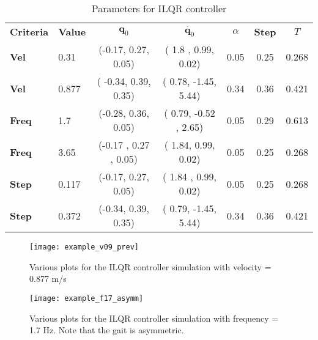 \renewcommand{\arraystretch}{1.}
\begin{table}[h!]
	\centering    
      \caption{Parameters for ILQR controller}
      \label{tab:ilqr_result}
		
	\begin{tabular}{l l | c  c  c c c}
		\toprule
\bf{Criteria} & \bf{Value} & $\bm{q}_0$ & $\dot{\bm{q}_0}$ & $\alpha$ &  \bf{Step} & $T$\\
\bf{Vel} & 0.31 & (-0.17,  0.27,  0.05) & (  1.8 ,  0.99,  0.02) &   0.05 & 0.25 & 0.268 \\
\bf{Vel} & 0.877 &( -0.34,  0.39,  0.35) & (  0.78, -1.45,  5.44) &   0.34&       0.36 & 0.421\\
\bf{Freq} & 1.7 & (-0.28,  0.36,  0.05) & ( 0.79, -0.52 ,  2.65) &   0.05 &  0.29 &0.613  \\
\bf{Freq} & 3.65 & (-0.17 ,  0.27 ,  0.05) & (  1.84,  0.99,  0.02) &   0.05 &        0.25 &0.268 \\
\bf{Step} & 0.117 &(-0.17,  0.27,  0.05) & (  1.84 ,  0.99,  0.02) &  0.05& 0.25& 0.268\\
\bf{Step} & 0.372 &(-0.34,  0.39,  0.35) & (  0.79, -1.45,  5.44) &   0.34& 0.36& 0.421 
	\end{tabular}
\end{table}



\begin{figure}
\texttt{[image: example\_v09\_prev]}
\caption{Various plots for the ILQR controller simulation with velocity = 0.877 m/s}
\label{fig:ilqr_plot}
\end{figure}

\begin{figure}
\texttt{[image: example\_f17\_asymm]}
\caption{Various plots for the ILQR controller simulation with frequency = 1.7 Hz. Note that the gait is asymmetric.}
\label{fig:ilqr_plot_asym}
\end{figure}
